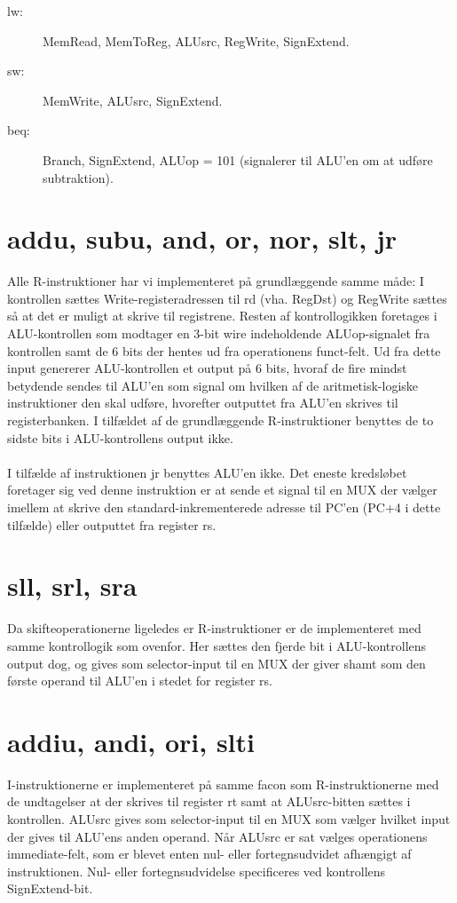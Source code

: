 \documentclass[10pt,a4paper,danish]{article}
\begin{document}
\begin{description}
\item[lw:] MemRead, MemToReg, ALUsrc, RegWrite, SignExtend.
\item[sw:] MemWrite, ALUsrc, SignExtend.
\item[beq:] Branch, SignExtend, ALUop = 101 (signalerer til ALU'en om at udføre subtraktion).
\end{description}

\section{addu, subu, and, or, nor, slt, jr}
Alle R-instruktioner har vi implementeret på grundlæggende samme måde: I kontrollen sættes Write-registeradressen til rd (vha. RegDst) og RegWrite sættes så at det er muligt at skrive til registrene. Resten af kontrollogikken foretages i ALU-kontrollen som modtager en 3-bit wire indeholdende ALUop-signalet fra kontrollen samt de 6 bits der hentes ud fra operationens funct-felt. Ud fra dette input genererer ALU-kontrollen et output på 6 bits, hvoraf de fire mindst betydende sendes til ALU'en som signal om hvilken af de aritmetisk-logiske instruktioner den skal udføre, hvorefter outputtet fra ALU'en skrives til registerbanken. I tilfældet af de grundlæggende R-instruktioner benyttes de to sidste bits i ALU-kontrollens output ikke.

\paragraph{}
I tilfælde af instruktionen jr benyttes ALU'en ikke. Det eneste kredsløbet foretager sig ved denne instruktion er at sende et signal til en MUX der vælger imellem at skrive den standard-inkrementerede adresse til PC'en (PC+4 i dette tilfælde) eller outputtet fra register rs. 

\section{sll, srl, sra}
Da skifteoperationerne ligeledes er R-instruktioner er de implementeret med samme kontrollogik som ovenfor. Her sættes den fjerde bit i ALU-kontrollens output dog, og gives som selector-input til en MUX der giver shamt som den første operand til ALU'en i stedet for register rs. 

\section{addiu, andi, ori, slti} 
I-instruktionerne er implementeret på samme facon som R-instruktionerne med de undtagelser at der skrives til register rt samt at ALUsrc-bitten sættes i kontrollen. ALUsrc gives som selector-input til en MUX som vælger hvilket input der gives til ALU'ens anden operand. Når ALUsrc er sat vælges operationens immediate-felt, som er blevet enten nul- eller fortegnsudvidet afhængigt af instruktionen. Nul- eller fortegnsudvidelse specificeres ved kontrollens SignExtend-bit. 
\end{document}
